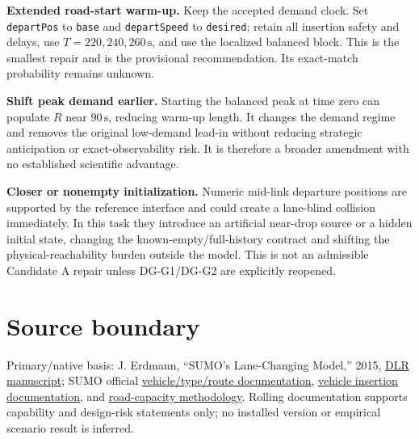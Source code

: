 \documentclass[11pt]{article}
\newcommand{\unit}[1]{\,\mathrm{#1}}
\begin{document}
\textbf{Extended road-start warm-up.}  Keep the accepted demand clock.  Set
\texttt{departPos} to \texttt{base} and \texttt{departSpeed} to
\texttt{desired}; retain all
insertion safety and delays, use $T=220,240,260\unit{s}$, and use the localized
balanced block.  This is the smallest repair and is the provisional
recommendation.  Its exact-match probability remains unknown.

\textbf{Shift peak demand earlier.}  Starting the balanced peak at time zero can
populate $R$ near $90\unit{s}$, reducing warm-up length.  It changes the demand
regime and removes the original low-demand lead-in without reducing strategic
anticipation or exact-observability risk.  It is therefore a broader amendment
with no established scientific advantage.

\textbf{Closer or nonempty initialization.}  Numeric mid-link departure positions
are supported by the reference interface and could create a lane-blind collision
immediately.  In this task they introduce an artificial near-drop source or a
hidden initial state, changing the known-empty/full-history contract and shifting
the physical-reachability burden outside the model.  This is not an admissible
Candidate A repair unless DG-G1/DG-G2 are explicitly reopened.

\section{Source boundary}

Primary/native basis: J. Erdmann, ``SUMO's Lane-Changing Model,'' 2015,
\href{https://elib.dlr.de/102254/1/Springer-SUMOs_Lane_changing_model.pdf}{DLR manuscript};
SUMO official
\href{https://sumo.dlr.de/docs/Definition_of_Vehicles,_Vehicle_Types,_and_Routes.html}{vehicle/type/route documentation},
\href{https://sumo.dlr.de/docs/Simulation/VehicleInsertion.html}{vehicle insertion documentation}, and
\href{https://sumo.dlr.de/docs/Simulation/RoadCapacity.html}{road-capacity methodology}.
Rolling documentation supports capability and design-risk statements only; no
installed version or empirical scenario result is inferred.
\end{document}
